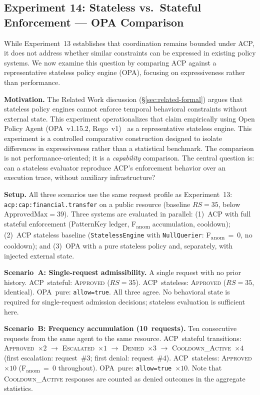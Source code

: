 \documentclass[11pt]{article}
\theoremstyle{definition}
\begin{document}
\subsection{Experiment 14: Stateless vs.\ Stateful Enforcement --- OPA Comparison}
\label{sec:exp14}

While Experiment~13 establishes that coordination remains bounded under ACP,
it does not address whether similar constraints can be expressed in existing policy systems.
We now examine this question by comparing ACP against a representative stateless policy engine
(OPA), focusing on expressiveness rather than performance.

\textbf{Motivation.}
The Related Work discussion (\S\ref{sec:related-formal}) argues that stateless policy engines
cannot enforce temporal behavioral constraints without external state.
This experiment operationalizes that claim empirically using Open Policy Agent
(OPA~v1.15.2, Rego~v1)~\cite{opa} as a representative stateless engine.
This experiment is a controlled comparative construction designed to isolate differences
in expressiveness rather than a statistical benchmark.
The comparison is not performance-oriented; it is a \emph{capability} comparison.
The central question is: can a stateless evaluator reproduce ACP's enforcement behavior
over an execution trace, without auxiliary infrastructure?

{\sloppy
\textbf{Setup.}
All three scenarios use the same request profile as Experiment~13:
\texttt{acp:cap:financial.transfer} on a public resource
(baseline $RS = 35$, below $\mathrm{ApprovedMax}=39$).
Three systems are evaluated in parallel: (1)~ACP with full stateful enforcement
(PatternKey ledger, F\textsubscript{anom} accumulation, cooldown); (2)~ACP stateless
baseline (\texttt{StatelessEngine} with \texttt{NullQuerier}: F\textsubscript{anom}~=~0,
no cooldown); and (3)~OPA with a pure stateless policy and, separately, with injected
external state.
\par}

\textbf{Scenario~A: Single-request admissibility.}
A single request with no prior history.
ACP~stateful: \textsc{Approved} ($RS=35$).
ACP~stateless: \textsc{Approved} ($RS=35$, identical).
OPA~pure: \texttt{allow=true}.
All three agree.
No behavioral state is required for single-request admission decisions; stateless
evaluation is sufficient here.

\textbf{Scenario~B: Frequency accumulation (10~requests).}
Ten consecutive requests from the same agent to the same resource.
ACP~stateful transitions: \textsc{Approved}~$\times 2$ $\to$ \textsc{Escalated}~$\times 1$
$\to$ \textsc{Denied}~$\times 3$ $\to$ \textsc{Cooldown\_Active}~$\times 4$
(first escalation: request~\#3; first denial: request~\#4).
ACP~stateless: \textsc{Approved}~$\times 10$ (F\textsubscript{anom}~=~0 throughout).
OPA~pure: \texttt{allow=true}~$\times 10$.
Note that \textsc{Cooldown\_Active} responses are counted as denied outcomes
in the aggregate statistics.
\end{document}
